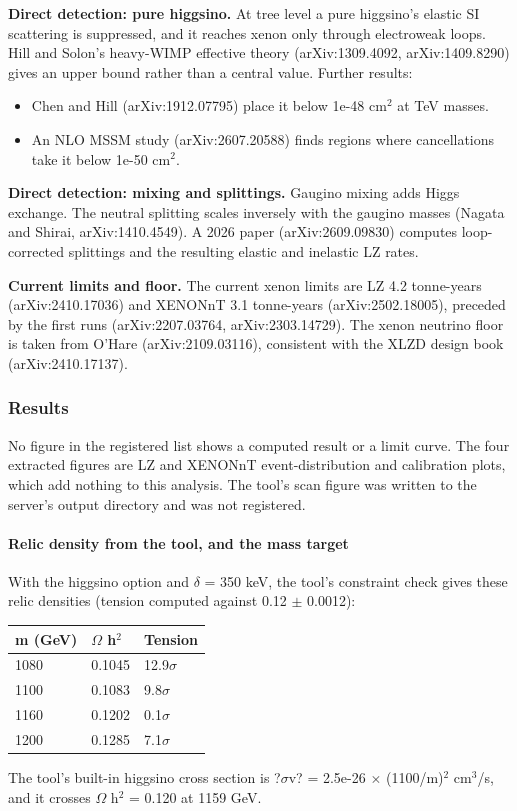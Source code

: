 \documentclass[11pt,a4paper]{article}
\begin{document}
\textbf{Direct detection: pure higgsino.} At tree level a pure higgsino's elastic SI scattering is suppressed, and it reaches xenon only through electroweak loops. Hill and Solon's heavy-WIMP effective theory (arXiv:1309.4092, arXiv:1409.8290) gives an upper bound rather than a central value. Further results:

\begin{itemize}
  \item Chen and Hill (arXiv:1912.07795) place it below 1e-48 cm$^2$ at TeV masses.
  \item An NLO MSSM study (arXiv:2607.20588) finds regions where cancellations take it below 1e-50 cm$^2$.
\end{itemize}
\textbf{Direct detection: mixing and splittings.} Gaugino mixing adds Higgs exchange. The neutral splitting scales inversely with the gaugino masses (Nagata and Shirai, arXiv:1410.4549). A 2026 paper (arXiv:2609.09830) computes loop-corrected splittings and the resulting elastic and inelastic LZ rates.

\textbf{Current limits and floor.} The current xenon limits are LZ 4.2 tonne-years (arXiv:2410.17036) and XENONnT 3.1 tonne-years (arXiv:2502.18005), preceded by the first runs (arXiv:2207.03764, arXiv:2303.14729). The xenon neutrino floor is taken from O'Hare (arXiv:2109.03116), consistent with the XLZD design book (arXiv:2410.17137).

\subsubsection*{Results}
No figure in the registered list shows a computed result or a limit curve. The four extracted figures are LZ and XENONnT event-distribution and calibration plots, which add nothing to this analysis. The tool's scan figure was written to the server's output directory and was not registered.

\paragraph{Relic density from the tool, and the mass target}
With the higgsino option and $\delta$ = 350 keV, the tool's constraint check gives these relic densities (tension computed against 0.12 $\pm$ 0.0012):

\begin{longtable}{@{}p{}p{}p{}@{}}
\toprule
\textbf{m (GeV)} & \textbf{$\Omega$ h$^2$} & \textbf{Tension} \\ \midrule \endhead
1080 & 0.1045 & 12.9$\sigma$ \\
1100 & 0.1083 & 9.8$\sigma$ \\
1160 & 0.1202 & 0.1$\sigma$ \\
1200 & 0.1285 & 7.1$\sigma$ \\
\bottomrule\end{longtable}
The tool's built-in higgsino cross section is ?$\sigma$v? = 2.5e-26 $\times$ (1100/m)$^2$ cm$^3$/s, and it crosses $\Omega$ h$^2$ = 0.120 at 1159 GeV.
\end{document}
